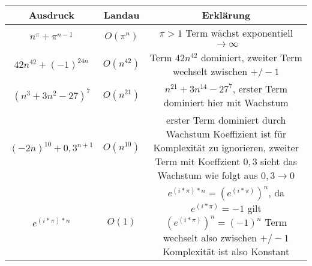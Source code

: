 \documentclass[a4paper, 10pt]{article}
\begin{document}
\begin{center} 
    \begin{tabular}{c|c|c} 
     \hline
     Ausdruck & Landau & Erklärung \\ [0.5ex] 
     \hline\hline
     $n^{\pi}+\pi^{n-1}$ & $O(\pi^{n})$ & $\pi > 1$ Term wächst exponentiell $\xrightarrow{} \infty$\\ 
     \hline
     $42n^{42}+(-1)^{24n}$ & $O(n^{42})$ & Term $42n^{42}$ dominiert, zweiter Term wechselt zwischen $+/-1$\\
     \hline
     $(n^{3}+3n^{2}-27)^{7}$ & $O(n^{21})$ & $n^{21}+3n^{14}-27^{7}$, erster Term dominiert hier mit Wachstum\\
     \hline
     $(-2n)^{10}+0,3^{n+1}$ & $O(n^{10})$ & \makecell{erster Term dominiert durch Wachstum\\ Koeffizient ist für Komplexität zu ignorieren,\\ zweiter Term mit Koeffzient $0,3$ sieht das Wachstum wie folgt aus $0,3 \xrightarrow{} 0$}\\
     \hline
     $e^{(i*\pi)*n}$ & $O(1)$ & \makecell{$e^{(i*\pi)*n} = (e^{(i*\pi)})^{n}$,\\ da $e^{(i*\pi)} = -1$ gilt $(e^{(i*\pi)})^{n} = (-1)^{n}$\\ Term wechselt also zwischen $+/-1$ Komplexität ist also Konstant}\\
     \hline
    \end{tabular}
\end{center}
\end{document}
